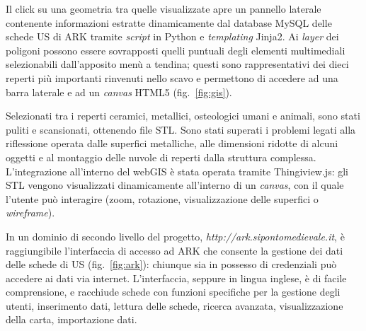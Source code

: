 \documentclass[svgnames,portrait,final,usenames,dvipsnames]{baposter}
\begin{document}
\begin{poster}
{\begin{multicols}{2}[][]
\begin{description}
                    \vspace{-0.25cm}
                    Il click su una geometria tra quelle visualizzate apre un pannello laterale contenente informazioni estratte dinamicamente dal database MySQL delle schede US di ARK tramite \textit{script} in Python e \textit{templating} Jinja2. Ai \textit{layer} dei poligoni possono essere sovrapposti quelli puntuali degli elementi multimediali selezionabili dall'apposito menù a tendina; questi sono rappresentativi dei dieci reperti più importanti rinvenuti nello scavo e permettono di accedere ad una barra laterale e ad un \emph{canvas} HTML5 (fig.~\ref{fig:gis}).

                \item[modelli~3D]

                    Selezionati tra i reperti ceramici, metallici, osteologici umani e animali, sono stati puliti e scansionati, ottenendo file STL. Sono stati superati i problemi legati alla riflessione operata dalle superfici metalliche, alle dimensioni ridotte di alcuni oggetti e al montaggio delle nuvole di reperti dalla struttura complessa. L'integrazione all'interno del webGIS è stata operata tramite Thingiview.js: gli STL vengono visualizzati dinamicamente all'interno di un \textit{canvas}, con il quale l'utente può interagire (zoom, rotazione, visualizzazione delle superfici o \textit{wireframe}).

                \item[interfaccia~ARK]

                    In un dominio di secondo livello del progetto, \emph{http://ark.sipontomedievale.it}, è raggiungibile l'interfaccia di accesso ad ARK che consente la gestione dei dati delle schede di US (fig.~\ref{fig:ark}): chiunque sia in possesso di credenziali può accedere ai dati via internet. L'interfaccia, seppure in lingua inglese, è di facile comprensione, e racchiude schede con funzioni specifiche per la gestione degli utenti, inserimento dati, lettura delle schede, ricerca avanzata, visualizzazione della carta, importazione dati.
        
            \end{description}
        \end{multicols}

        \vspace{-0.5cm}

}
\end{poster}
\end{document}
